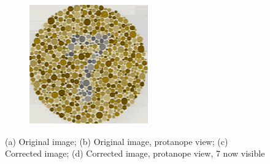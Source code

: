 \documentclass[10pt,twocolumn,letterpaper]{article}
\begin{document}
\begin{figure}[h]
\begin{subfigure}{0.23\textwidth}
    \caption{}
  \end{subfigure}
  \begin{subfigure}{0.23\textwidth}
    \includegraphics[width=\textwidth]{isihara4.png}
    \caption{}
  \end{subfigure}
  \caption{(a) Original image; (b) Original image, protanope view; (c) Corrected image; (d) Corrected image, protanope view, 7 now visible}
  \label{fig:isihara}
\end{figure}
\end{document}
